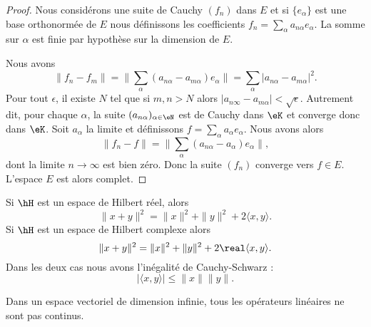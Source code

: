 \begin{proof}
    Nous considérons une suite de Cauchy \( (f_n)\) dans \( E\) et si \( \{ e_{\alpha} \} \) est une base orthonormée de \( E\) nous définissons les coefficients \( f_n=\sum_{\alpha}a_{n\alpha}e_{\alpha} \). La somme sur \( \alpha\) est finie par hypothèse sur la dimension de \( E\).

    Nous avons
    \begin{equation}
        \| f_n-f_m \|=\| \sum_{\alpha}(a_{n\alpha}-a_{m\alpha})e_{\alpha} \|=\sum_{\alpha}| a_{n\alpha}-a_{m\alpha} |^2.
    \end{equation}
    Pour tout \( \epsilon\), il existe \( N\) tel que si \( m,n>N\) alors \( | a_{n\infty}-a_{m\alpha} |<\sqrt{ \epsilon }\). Autrement dit, pour chaque \( \alpha\), la suite \( (a_{n\alpha})_{\alpha\in \eN}\) est de Cauchy dans \( \eK\) et converge donc dans \( \eK\). Soit \( a_{\alpha}\) la limite et définissons \( f=\sum_{\alpha}a_{\alpha}e_{\alpha}\). Nous avons alors
    \begin{equation}
        \| f_n-f \|=\| \sum_{\alpha}(a_{n\alpha}-a_{\alpha})e_{\alpha} \|,
    \end{equation}
    dont la limite \( n\to \infty\) est bien zéro. Donc la suite \( (f_n)\) converge vers \( f\in E\). L'espace \( E\) est alors complet.
\end{proof}

\begin{proposition}     \label{PropTdupIG}
    Si \( \hH\) est un espace de Hilbert réel, alors
    \begin{equation}
        \| x+y \|^2=\| x \|^2+\| y \|^2+2\langle x, y\rangle .
    \end{equation}
    Si \( \hH\) est un espace de Hilbert complexe alors
    \begin{equation}        \label{EqrbBlkK}
        \| x+y \|^2=\| x \|^2+\| y \|^2+2\real\langle x, y\rangle .
    \end{equation}
    Dans les deux cas nous avons l'inégalité de Cauchy-Schwarz :
    \begin{equation}
        | \langle x, y\rangle  |\leq \| x \|\| y \|.
    \end{equation}
\end{proposition}

Dans un espace vectoriel de dimension infinie, tous les opérateurs linéaires ne sont pas continus.

